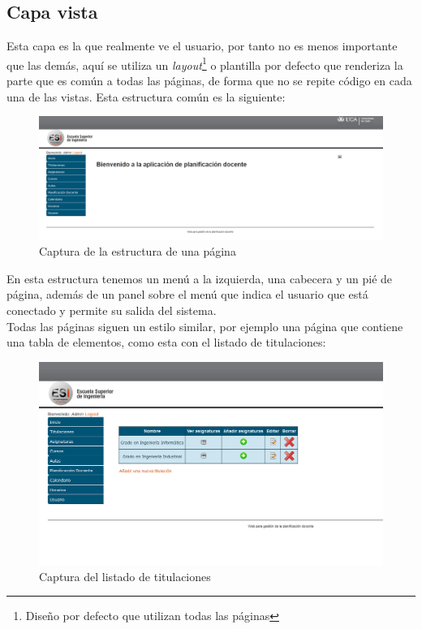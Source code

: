 \documentclass[a4paper,11pt]{article} %
\begin{document}
\subsection{Capa vista}

Esta capa es la que realmente ve el usuario, por tanto no es menos importante que las demás, aquí se utiliza un {\em layout}\footnote{Diseño por defecto que utilizan todas las páginas} o plantilla por defecto que renderiza la parte que es común a todas las páginas, de forma que no se repite código en cada una de las vistas. Esta estructura común es la siguiente:

\begin{figure}[H] 
  \label{captura-layout} 
	\begin{center}
    \includegraphics[scale=0.40]{./layout.png}
  \end{center}
\caption{Captura de la estructura de una página}
\end{figure}

En esta estructura tenemos un menú a la izquierda, una cabecera y un pié de página, además de un panel sobre el menú que indica el usuario que está conectado y permite su salida del sistema.\\

Todas las páginas siguen un estilo similar, por ejemplo una página que contiene una tabla de elementos, como esta con el listado de titulaciones:

\begin{figure}[H] 
  \label{captura-index-titulaciones} 
	\begin{center}
    \includegraphics[scale=0.57]{./index-titulaciones.png}
  \end{center}
\caption{Captura del listado de titulaciones}
\end{figure}
\end{document}
